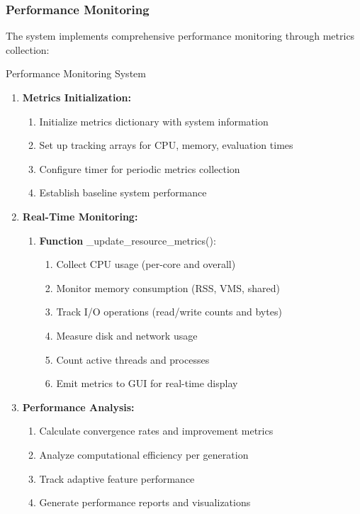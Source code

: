 \documentclass[12pt,a4paper]{article}
\begin{document}
\subsubsection{Performance Monitoring}

The system implements comprehensive performance monitoring through metrics collection:

\begin{algorithm}
\caption{Performance Monitoring System}
\begin{enumerate}
    \item \textbf{Metrics Initialization:}
    \begin{enumerate}
        \item Initialize metrics dictionary with system information
        \item Set up tracking arrays for CPU, memory, evaluation times
        \item Configure timer for periodic metrics collection
        \item Establish baseline system performance
    \end{enumerate}
    \item \textbf{Real-Time Monitoring:}
    \begin{enumerate}
        \item \textbf{Function} \_update\_resource\_metrics():
        \begin{enumerate}
            \item Collect CPU usage (per-core and overall)
            \item Monitor memory consumption (RSS, VMS, shared)
            \item Track I/O operations (read/write counts and bytes)
            \item Measure disk and network usage
            \item Count active threads and processes
            \item Emit metrics to GUI for real-time display
        \end{enumerate}
    \end{enumerate}
    \item \textbf{Performance Analysis:}
    \begin{enumerate}
        \item Calculate convergence rates and improvement metrics
        \item Analyze computational efficiency per generation
        \item Track adaptive feature performance
        \item Generate performance reports and visualizations
    \end{enumerate}
\end{enumerate}
\end{algorithm}
\end{document}
